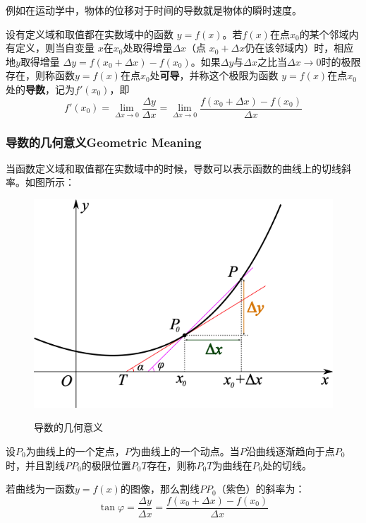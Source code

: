 \documentclass[UTF8]{ctexart}
\begin{document}
{	例如在运动学中，物体的位移对于时间的导数就是物体的瞬时速度。
\begin{question}
	设有定义域和取值都在实数域中的函数 $y=f(x)$。若$f(x)$在点$x_0$的某个邻域内有定义，则当自变量 $x$在$x_0$处取得增量$\Delta x$（点 $x_{0}+\Delta x$仍在该邻域内）时，相应地$y$取得增量 $\Delta y=f(x_0+\Delta x)-f(x_0)$。如果$\Delta y$与$\Delta x$之比当$\Delta x\to 0 $时的极限存在，则称函数$y=f(x)$在点$x_0$处\textbf{可导}，并称这个极限为函数 $y=f(x)$在点$x_0$处的\textbf{导数}，记为$f'(x_0)$，即
\begin{equation}
  f'(x_0)=\lim_{\Delta x \to 0} \frac{\Delta y}{\Delta x}=\lim_{\Delta x \to 0} \frac{f(x_0+\Delta x)-f(x_0)}{\Delta x}
\end{equation}
\end{question}

\subsubsection{导数的几何意义Geometric Meaning}
当函数定义域和取值都在实数域中的时候，导数可以表示函数的曲线上的切线斜率。如图所示：
\begin{figure}[H]
  \centering
  \includegraphics[scale=0.4]{Derivative.png}\\
  \caption{导数的几何意义}
\end{figure}

设$P_0$为曲线上的一个定点，$P$为曲线上的一个动点。当$P$沿曲线逐渐趋向于点$P_0$时，并且割线$PP_0$的极限位置$P_0T$存在，则称$P_0T$为曲线在$P_0$处的切线。

若曲线为一函数$y=f(x)$的图像，那么割线$PP_0$（紫色）的斜率为：
\begin{equation}
  \tan \varphi = \frac{\Delta y}{\Delta x}=\frac{f(x_0+\Delta x)-f(x_0)}{\Delta x}
\end{equation}

}
\end{document}
